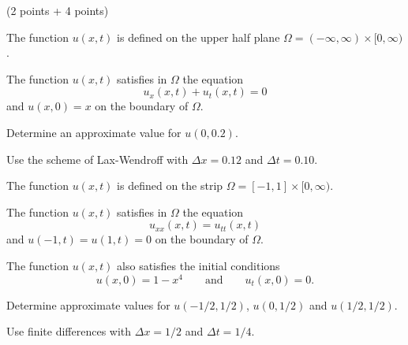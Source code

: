 (2 points + 4 points)
\begin{teilaufgaben}
\item
The function $u(x,t)$ is defined on the upper half plane
$\Omega = (-\infty, \infty) \times [0,\infty)$.

The function $u(x,t)$ satisfies in $\Omega$ the equation
\[
u_{x}(x,t) + u_{t}(x,t) = 0 
\]
and $u(x,0) = x$ on the boundary of $\Omega$. 

Determine an approximate value for $u(0,0.2)$.

Use the scheme of Lax-Wendroff with $\Delta x = 0.12$ and $\Delta t = 0.10.$

\item
The function $u(x,t)$ is defined on the strip
$\Omega = [-1, 1] \times [0,\infty)$.

The function $u(x,t)$ satisfies in $\Omega$ the equation
\[
u_{xx}(x,t) = u_{tt}(x,t)
\]
and  $u(-1,t) = u(1,t) = 0$ on the boundary of $\Omega$. 

The function $u(x,t)$ also satisfies the initial conditions
\[
u(x,0) = 1-x^4 \qquad\text{and}\qquad u_t(x,0) = 0.
\]

Determine approximate values for $u(-1/2,1/2)$, $u(0,1/2)$ and $u(1/2,1/2)$.

Use finite differences with $\Delta x = 1/2$ and $\Delta t = 1/4.$
\end{teilaufgaben}

